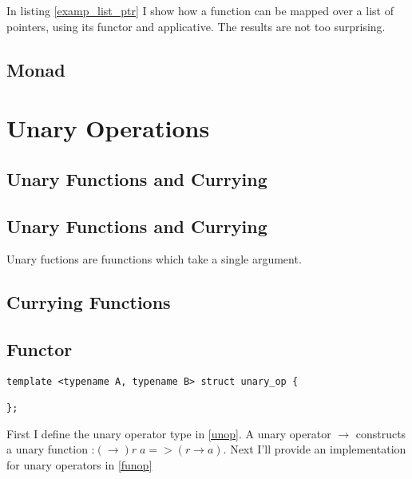 \documentclass[12pt,fleqn]{article}
\begin{document}
In listing \ref{examp_list_ptr} I show how a function can be mapped over a list of pointers, using its functor and applicative.
The results are not too surprising.

%
%
\subsection{Monad}

%
%
\section{Unary Operations}
%
%

\subsection{Unary Functions and Currying}

\subsection{Unary Functions and Currying}

Unary fuctions are fuunctions which take a single argument.


\subsection{Currying Functions}
%
%
%


\subsection{Functor}
%
%
%

\begin{minipage}{\linewidth}
\begin{lstlisting}[caption=unary operator, label=unop]
template <typename A, typename B> struct unary_op {
  
};
\end{lstlisting}
\end{minipage}
%
%
%

First I define the unary operator type in \ref{unop}.
A unary operator $\rightarrow$ constructs a unary function :$(\rightarrow) r\;a => (r \rightarrow a)$.
Next I'll provide an implementation for unary operators in \ref{funop}
\end{document}
